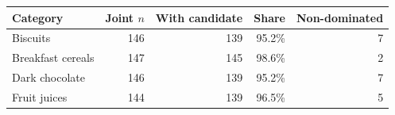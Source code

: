 \begin{tabular}{lrrrr}
\toprule
Category & Joint $n$ & With candidate & Share & Non-dominated \\
\midrule
Biscuits & 146 & 139 & 95.2\% & 7 \\
Breakfast cereals & 147 & 145 & 98.6\% & 2 \\
Dark chocolate & 146 & 139 & 95.2\% & 7 \\
Fruit juices & 144 & 139 & 96.5\% & 5 \\
\bottomrule
\end{tabular}
